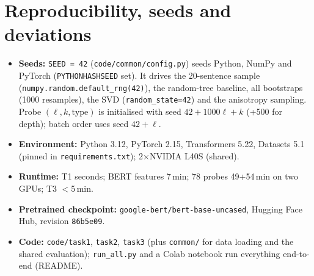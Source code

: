 \documentclass[11pt,a4paper]{article}
\begin{document}
\section{Reproducibility, seeds and deviations}\label{sec:repro}
\begin{itemize}
\item \textbf{Seeds:} \texttt{SEED = 42} (\texttt{code/common/config.py}) seeds Python, NumPy and PyTorch (\texttt{PYTHONHASHSEED} set).
It drives the 20-sentence sample (\texttt{numpy.random.default\_rng(42)}), the random-tree baseline, all bootstraps (1000 resamples), the SVD
(\texttt{random\_state=42}) and the anisotropy sampling. Probe $(\ell,k,\text{type})$ is initialised with seed $42+1000\ell+k$ (+500 for
depth); batch order uses seed $42+\ell$.
\item \textbf{Environment:} Python 3.12, PyTorch 2.15, Transformers 5.22, Datasets 5.1 (pinned in \texttt{requirements.txt}); 2$\times$NVIDIA L40S (shared).
\item \textbf{Runtime:} T1 seconds; BERT features 7\,min; 78 probes 49+54\,min on two GPUs; T3 $<$5\,min.
\item \textbf{Pretrained checkpoint:} \texttt{google-bert/bert-base-uncased}, Hugging Face Hub, revision \texttt{86b5e09}.
\item \textbf{Code:} \texttt{code/task1}, \texttt{task2}, \texttt{task3} (plus \texttt{common/} for data loading and the shared evaluation);
\texttt{run\_all.py} and a Colab notebook run everything end-to-end (README).
\end{itemize}
\end{document}
